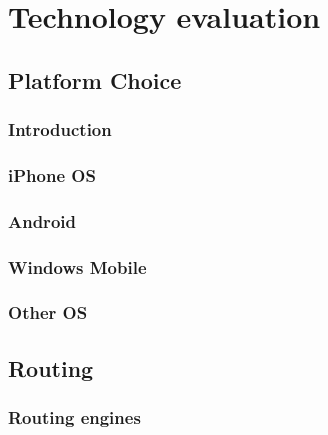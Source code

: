 \documentclass[11pt,a4paper]{scrreprt}
\begin{document}
\chapter{Technology evaluation} %

	\section{Platform Choice} %
	\label{chp:platform_choice}

	\subsection{Introduction} %
	\label{sec:platform_introduction}
	

	\subsection{iPhone OS} %
	\label{sec:iphone}
	

	\subsection{Android} %
	\label{sec:android_plattform_choice}
	

	\subsection{Windows Mobile} %
	\label{sec:win_mobile}
	

	\subsection{Other OS} %
	\label{sec:other_os}
	
	
	\section{Routing} %
	\label{sec:android_routing}
	
	
	\subsection{Routing engines}
	\label{sub:routing_engines}
	
\end{document}
